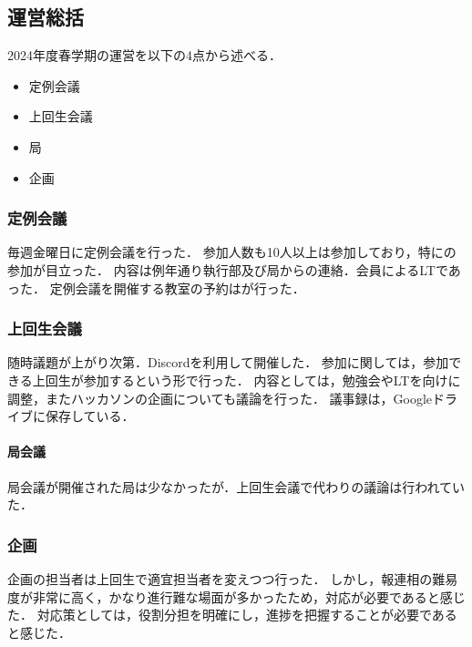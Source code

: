 \subsection*{運営総括}


2024年度春学期の運営を以下の4点から述べる．
\begin{itemize}
    \item 定例会議
    \item 上回生会議
    \item 局
    \item 企画
\end{itemize}

\subsubsection*{定例会議}
毎週金曜日に定例会議を行った．
参加人数も10人以上は参加しており，特に\firstGrade{}の参加が目立った．
内容は例年通り執行部及び局からの連絡．会員によるLTであった．
定例会議を開催する教室の予約は\kensuiChief{}が行った．

\subsubsection*{上回生会議}
随時議題が上がり次第．Discordを利用して開催した．
参加に関しては，参加できる上回生が参加するという形で行った．
内容としては，勉強会やLTを\firstGrade{}向けに調整，またハッカソンの企画についても議論を行った．
議事録は，Googleドライブに保存している．

\paragraph*{局会議}
局会議が開催された局は少なかったが．上回生会議で代わりの議論は行われていた．

\subsubsection*{企画}
企画の担当者は上回生で適宜担当者を変えつつ行った．
しかし，報連相の難易度が非常に高く，かなり進行難な場面が多かったため，対応が必要であると感じた．
対応策としては，役割分担を明確にし，進捗を把握することが必要であると感じた．
